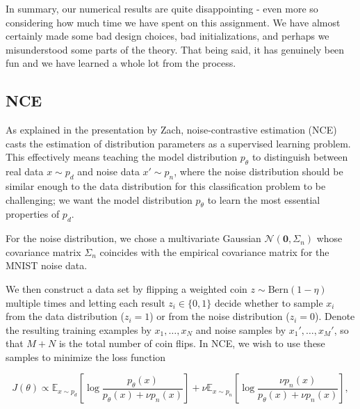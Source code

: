\documentclass[a4paper]{article}
\theoremstyle{definition}
\theoremstyle{plain}
\begin{document}
In summary, our numerical results are quite disappointing - even more so considering how much time we have spent on this assignment. We have almost certainly made some bad design choices, bad initializations, and perhaps we misunderstood some parts of the theory. That being said, it has genuinely been fun and we have learned a whole lot from the process. 


\subsection*{NCE}

As explained in the presentation by Zach, noise-contrastive estimation (NCE) casts the estimation of distribution parameters as a supervised learning problem. This effectively means teaching the model distribution $p_\theta$ to distinguish between real data $x \sim p_d$ and noise data $x' \sim p_n$, where the noise distribution should be similar enough to the data distribution for this classification problem to be challenging; we want the model distribution $p_\theta$ to learn  the most essential properties of $p_d$.

For the noise distribution, we chose a multivariate Gaussian $\mathcal{N}(\mathbf{0},\Sigma_n)$ whose covariance matrix $\Sigma_n$ coincides with the empirical covariance matrix for the MNIST noise data.

We then construct a data set by flipping a weighted coin $z \sim \text{Bern}(1-\eta)$ multiple times and letting each result $z_i \in \{0,1\}$ decide whether to sample $x_i$ from the data distribution ($z_i = 1$) or from the noise distribution ($z_i = 0$). Denote the resulting training examples by $x_1,\ldots,x_N$ and noise samples by $x_1',\ldots,x_M'$, so that $M+N$ is the total number of coin flips. In NCE, we wish to use these samples to minimize the loss function

\begin{equation}\label{J_function}
J(\theta) \propto \mathbb{E}_{x \sim p_d} \left[ \log \frac{p_\theta(x)}{p_\theta(x) + \nu p_n(x)}\right] + \nu \mathbb{E}_{x \sim p_n} \left[ \log \frac{ \nu p_n(x)}{p_\theta(x) + \nu p_n(x)}\right],
\end{equation}
\end{document}
